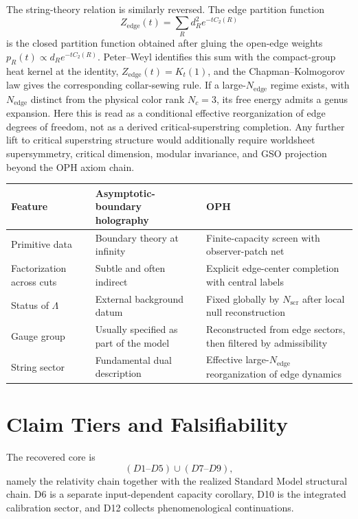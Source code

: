 \documentclass[11pt]{article}
\begin{document}
The string-theory relation is similarly reversed. The edge partition function
\[
Z_{\mathrm{edge}}(t)=\sum_R d_R^2 e^{-t C_2(R)}
\]
is the closed partition function obtained after gluing the open-edge weights $p_R(t)\propto d_R e^{-tC_2(R)}$. Peter--Weyl identifies this sum with the compact-group heat kernel at the identity, \(Z_{\mathrm{edge}}(t)=K_t(1)\), and the Chapman--Kolmogorov law gives the corresponding collar-sewing rule. If a large-$N_{\mathrm{edge}}$ regime exists, with $N_{\mathrm{edge}}$ distinct from the physical color rank $N_c=3$, its free energy admits a genus expansion. Here this is read as a conditional effective reorganization of edge degrees of freedom, not as a derived critical-superstring completion. Any further lift to critical superstring structure would additionally require worldsheet supersymmetry, critical dimension, modular invariance, and GSO projection beyond the OPH axiom chain.

\begingroup
\footnotesize
\begin{tabular}{@{}>{\raggedright\arraybackslash}p{}>{\raggedright\arraybackslash}p{}>{\raggedright\arraybackslash}p{}@{}}
\toprule
Feature & Asymptotic-boundary holography & OPH \\
\midrule
Primitive data & Boundary theory at infinity & Finite-capacity screen with observer-patch net \\
Factorization across cuts & Subtle and often indirect & Explicit edge-center completion with central labels \\
Status of $\Lambda$ & External background datum & Fixed globally by $N_{\mathrm{scr}}$ after local null reconstruction \\
Gauge group & Usually specified as part of the model & Reconstructed from edge sectors, then filtered by admissibility \\
String sector & Fundamental dual description & Effective large-$N_{\mathrm{edge}}$ reorganization of edge dynamics \\
\bottomrule
\end{tabular}
\endgroup

\section{Claim Tiers and Falsifiability}

The recovered core is
\[
(D1\text{--}D5)\cup(D7\text{--}D9),
\]
namely the relativity chain together with the realized Standard Model structural chain. D6 is a separate input-dependent capacity corollary, D10 is the integrated calibration sector, and D12 collects phenomenological continuations.
\end{document}
